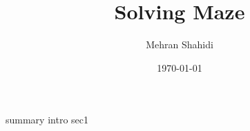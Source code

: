\documentclass{article}
\title{Solving Maze }
\author{Mehran Shahidi}
\date{\today}
\begin{document}
\maketitle
{}
{summary}
\newpage
\tableofcontents
\newpage
{}
{intro}
{sec1}
\newpage
\end{document}
